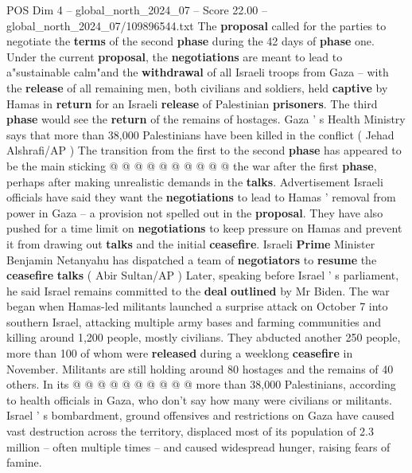 \begin{textsample}{POS Dim 4 – global\_north\_2024\_07 – Score 22.00 – global\_north\_2024\_07/109896544.txt}
The \textbf{proposal} called for the parties to negotiate the \textbf{terms} of the second \textbf{phase} during the 42 days of \textbf{phase} one.
Under the current \textbf{proposal}, the \textbf{negotiations} are meant to lead to a"sustainable calm"and the \textbf{withdrawal} of all Israeli troops from Gaza -- with the \textbf{release} of all remaining men, both civilians and soldiers, held \textbf{captive} by Hamas in \textbf{return} for an Israeli \textbf{release} of Palestinian \textbf{prisoners}.
The third \textbf{phase} would see the \textbf{return} of the remains of hostages.
Gaza ' s Health Ministry says that more than 38,000 Palestinians have been killed in the conflict ( Jehad Alshrafi/AP ) The transition from the first to the second \textbf{phase} has appeared to be the main sticking @ @ @ @ @ @ @ @ @ @ the war after the first \textbf{phase}, perhaps after making unrealistic demands in the \textbf{talks}.
Advertisement Israeli officials have said they want the \textbf{negotiations} to lead to Hamas ' removal from power in Gaza -- a provision not spelled out in the \textbf{proposal}.
They have also pushed for a time limit on \textbf{negotiations} to keep pressure on Hamas and prevent it from drawing out \textbf{talks} and the initial \textbf{ceasefire}.
Israeli \textbf{Prime} Minister Benjamin Netanyahu has dispatched a team of \textbf{negotiators} to \textbf{resume} the \textbf{ceasefire} \textbf{talks} ( Abir Sultan/AP ) Later, speaking before Israel ' s parliament, he said Israel remains committed to the \textbf{deal} \textbf{outlined} by Mr Biden.
The war began when Hamas-led militants launched a surprise attack on October 7 into southern Israel, attacking multiple army bases and farming communities and killing around 1,200 people, mostly civilians.
They abducted another 250 people, more than 100 of whom were \textbf{released} during a weeklong \textbf{ceasefire} in November.
Militants are still holding around 80 hostages and the remains of 40 others.
In its @ @ @ @ @ @ @ @ @ @ more than 38,000 Palestinians, according to health officials in Gaza, who don't say how many were civilians or militants.
Israel ' s bombardment, ground offensives and restrictions on Gaza have caused vast destruction across the territory, displaced most of its population of 2.3 million -- often multiple times -- and caused widespread hunger, raising fears of famine.

\end{textsample}
